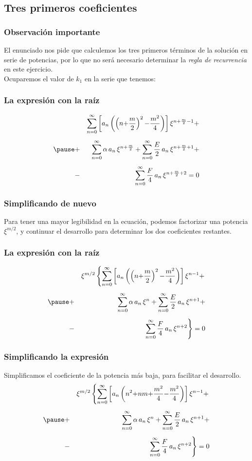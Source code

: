 \subsection{Tres primeros coeficientes}
\begin{frame}
\frametitle{Observación importante}
El enunciado nos pide que calculemos los tres primeros términos de la solución en serie de potencias, por lo que no será necesario determinar la \emph{regla de recurrencia} en este ejercicio.
\\
\bigskip
Ocuparemos el valor de $k_{1}$ en la serie que tenemos:
\end{frame}
\begin{frame}
\frametitle{La expresión con la raíz}
\vspace{-1cm}
\begin{eqnarray*}
&{}& \sum_{n=0}^{\infty} \left[ a_{n} \left( \left(n {+} \dfrac{m}{2} \right)^{2} {-} \dfrac{m^{2}}{4} \right) \right] \xi^{n+\frac{m}{2}-1} + \\[0.5em] \pause
&+& \sum_{n=0}^{\infty} \alpha \, a_{n} \, \xi^{n+\frac{m}{2}} + \sum_{n=0}^{\infty} \dfrac{E}{2} \, a_{n} \, \xi^{n+\frac{m}{2}+1} + \\[0.5em] 
&-& \sum_{n=0}^{\infty} \dfrac{F}{4} \, a_{n} \, \xi^{n+\frac{m}{2}+2} = 0
\end{eqnarray*}
\end{frame}
\begin{frame}
\frametitle{Simplificando de nuevo}
Para tener una mayor legibilidad en la ecuación, podemos factorizar una potencia $\xi^{m/2}$, y continuar el desarrollo para determinar los dos coeficientes restantes.
\end{frame}
\begin{frame}
\frametitle{La expresión con la raíz}
\vspace{-1cm}
\begin{eqnarray*}
&{}& \xi^{m/2} \left\{  \sum_{n=0}^{\infty} \left[ a_{n} \left( \left(n {+} \dfrac{m}{2} \right)^{2} {-} \dfrac{m^{2}}{4} \right) \right] \xi^{n-1} +  \right. \\[0.5em] \pause
&+& \sum_{n=0}^{\infty} \alpha \, a_{n} \, \xi^{n} + \sum_{n=0}^{\infty} \dfrac{E}{2} \, a_{n} \, \xi^{n+1} + \\[0.5em] 
&-& \left. \sum_{n=0}^{\infty} \dfrac{F}{4} \, a_{n} \, \xi^{n+2} \right\} = 0
\end{eqnarray*}
\end{frame}
\begin{frame}
\frametitle{Simplificando la expresión}
Simplificamos el coeficiente de la potencia más baja, para facilitar el desarrollo.
\begin{eqnarray*}
&{}& \xi^{m/2} \left\{  \sum_{n=0}^{\infty} \left[ a_{n} \left( n^{2} {+} n m {+} \dfrac{m^{2}}{4} {-} \dfrac{m^{2}}{4} \right) \right] \xi^{n-1} +  \right. \\[0.5em] \pause
&+& \sum_{n=0}^{\infty} \alpha \, a_{n} \, \xi^{n} + \sum_{n=0}^{\infty} \dfrac{E}{2} \, a_{n} \, \xi^{n+1} + \\[0.5em] 
&-& \left. \sum_{n=0}^{\infty} \dfrac{F}{4} \, a_{n} \, \xi^{n+2} \right\} = 0
\end{eqnarray*}
\end{frame}
